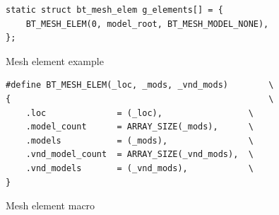 \documentclass[\main/main.tex]{subfiles}
\begin{document}
\begin{figure}[H]
    \begin{lstlisting}[style=CStyle]
static struct bt_mesh_elem g_elements[] = {
    BT_MESH_ELEM(0, model_root, BT_MESH_MODEL_NONE),
};
    \end{lstlisting}
    \caption{Mesh element example}
    \label{fig:mesh_element_example}
\end{figure}

\begin{figure}[H]
    \begin{lstlisting}[style=CStyle]
#define BT_MESH_ELEM(_loc, _mods, _vnd_mods)        \
{                                                   \
    .loc              = (_loc),                 \
    .model_count      = ARRAY_SIZE(_mods),      \
    .models           = (_mods),                \
    .vnd_model_count  = ARRAY_SIZE(_vnd_mods),  \
    .vnd_models       = (_vnd_mods),            \
}
    \end{lstlisting}
    \caption{Mesh element macro}
    \label{fig:mesh_element_macro}
\end{figure}
\end{document}
